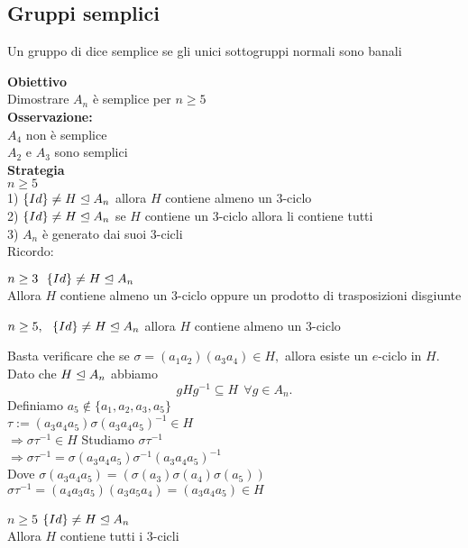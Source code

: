 \documentclass[12px]{article}
\begin{document}
\subsection{Gruppi semplici}
\begin{defi}
		Un gruppo di dice semplice se gli unici sottogruppi normali sono banali
	\end{defi}
	\textbf{Obiettivo}\\
	Dimostrare $A_n$ è semplice per  $n \geq 5$\\
	\textbf{Osservazione:}\\
	$A_4$ non è semplice\\
	$A_2$ e $A_3$ sono semplici\\
	\textbf{Strategia}\\
	$n \geq 5$\\
	1)  $\{Id\} \neq H\trianglelefteq A_n$ allora  $H$ contiene almeno un $3$-ciclo\\
	2) $\{Id\}\neq H\trianglelefteq A_n$ se $H$ contiene un $3$-ciclo allora li contiene tutti\\
	3) $A_n$ è generato dai suoi $3$-cicli\\
	Ricordo:
	\newpage
	\begin{lemm}
		$n\geq 3 \ \ \{Id\}\neq H\trianglelefteq A_n$\\
		Allora $H$ contiene almeno un $3$-ciclo oppure un prodotto di trasposizioni disgiunte
	\end{lemm}
	\begin{prop}
		$n\geq 5, \ \ \{Id\}\neq H\trianglelefteq A_n$ allora $H$ contiene almeno un $3$-ciclo
	\end{prop}
	\begin{dimo}
		Basta verificare che se $\sigma = (a_1a_2)(a_3a_4)\in H, $ allora esiste un $e$-ciclo in $H$.\\
		Dato che  $H\trianglelefteq A_n$ abbiamo 
		\[
			gHg^{-1}\subseteq H \ \ \forall g\in A_n
		.\] 
		Definiamo $a_5 \not\in \{a_1,a_2,a_3,a_5\}$\\
		$\tau := (a_3a_4a_5)\sigma(a_3a_4a_5)^{-1}\in H$\\
		$ \Rightarrow \sigma \tau^{-1}\in H$ Studiamo $\sigma\tau^{-1}$\\
		$ \Rightarrow \sigma\tau^{-1} = \sigma(a_3a_4a_5)\sigma^{-1}(a_3a_4a_5)^{-1}$ \\
		Dove  $\sigma(a_3a_4a_5) = (\sigma(a_3)\sigma(a_4)\sigma(a_5))$\\
		$\sigma\tau^{-1} = (a_4a_3a_5)(a_3a_5a_4) = (a_3a_4a_5)\in H$
	\end{dimo}
	\begin{teo}
		$n\geq 5$ $\{Id\}\neq H\trianglelefteq A_n$\\
		Allora  $H$ contiene tutti i $3$-cicli\\
	\end{teo}
\end{document}
